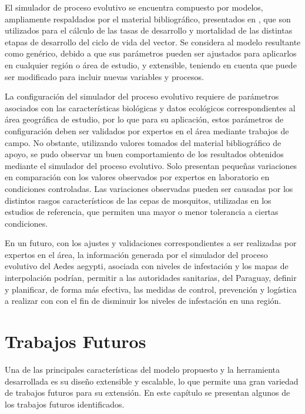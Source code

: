 El simulador de proceso evolutivo se encuentra compuesto por modelos, ampliamente respaldados por
el material bibliográfico, presentados en \cite{sharpe1977reaction, focks1993dynamic, schoolfield1981non, otero2006stochastic, rueda1990temperature}, que son utilizados para el cálculo de las tasas de desarrollo y mortalidad de las distintas etapas de desarrollo del ciclo de vida del vector. Se considera al modelo resultante como genérico, debido a que sus parámetros pueden ser ajustados para aplicarlos en cualquier región o área de estudio, y extensible, teniendo en cuenta que puede ser modificado para incluir nuevas variables y procesos.

La configuración del simulador del proceso evolutivo requiere de parámetros asociados con las características biológicas y datos ecológicos correspondientes al área geográfica de estudio, por lo que para su aplicación, estos parámetros de configuración deben ser validados por expertos en el área mediante trabajos de campo. No obstante, utilizando valores tomados del material bibliográfico de apoyo, se pudo observar un buen comportamiento de los resultados obtenidos mediante el simulador del proceso evolutivo. Solo presentan pequeñas variaciones en comparación con los valores observados por expertos en laboratorio en condiciones controladas. Las variaciones observadas pueden ser causadas por los distintos rasgos característicos de las cepas de mosquitos, utilizadas en los estudios de referencia, que permiten una mayor o menor tolerancia a ciertas condiciones.

En un futuro, con los ajustes y validaciones correspondientes a ser realizadas por expertos en el área, la información generada por el simulador del proceso evolutivo del Aedes aegypti, asociada con niveles de infestación y los mapas de interpolación podrían, permitir a las autoridades sanitarias, del Paraguay, definir y planificar, de forma más efectiva, las medidas de control, prevención y logística a realizar con con el fin de disminuir los niveles de infestación en una región.

\chapter{Trabajos Futuros}
Una de las principales características del modelo propuesto y la herramienta desarrollada es su
diseño extensible y escalable, lo que permite una gran variedad de trabajos futuros para su
extensión. En este capítulo se presentan algunos de los trabajos futuros identificados.

